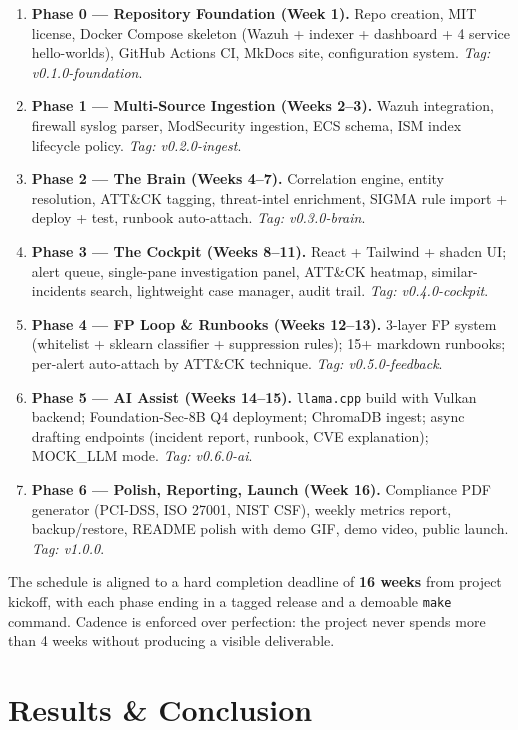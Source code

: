 \documentclass[11pt,a4paper]{article}
\begin{document}
\begin{enumerate}[leftmargin=*, itemsep=2pt]
  \item \textbf{Phase 0 — Repository Foundation (Week 1).} Repo creation, MIT license, Docker Compose skeleton (Wazuh + indexer + dashboard + 4 service hello-worlds), GitHub Actions CI, MkDocs site, configuration system. \textit{Tag: v0.1.0-foundation}.
  \item \textbf{Phase 1 — Multi-Source Ingestion (Weeks 2--3).} Wazuh integration, firewall syslog parser, ModSecurity ingestion, ECS schema, ISM index lifecycle policy. \textit{Tag: v0.2.0-ingest}.
  \item \textbf{Phase 2 — The Brain (Weeks 4--7).} Correlation engine, entity resolution, ATT\&CK tagging, threat-intel enrichment, SIGMA rule import + deploy + test, runbook auto-attach. \textit{Tag: v0.3.0-brain}.
  \item \textbf{Phase 3 — The Cockpit (Weeks 8--11).} React + Tailwind + shadcn UI; alert queue, single-pane investigation panel, ATT\&CK heatmap, similar-incidents search, lightweight case manager, audit trail. \textit{Tag: v0.4.0-cockpit}.
  \item \textbf{Phase 4 — FP Loop \& Runbooks (Weeks 12--13).} 3-layer FP system (whitelist + sklearn classifier + suppression rules); 15+ markdown runbooks; per-alert auto-attach by ATT\&CK technique. \textit{Tag: v0.5.0-feedback}.
  \item \textbf{Phase 5 — AI Assist (Weeks 14--15).} \texttt{llama.cpp} build with Vulkan backend; Foundation-Sec-8B Q4 deployment; ChromaDB ingest; async drafting endpoints (incident report, runbook, CVE explanation); MOCK\_LLM mode. \textit{Tag: v0.6.0-ai}.
  \item \textbf{Phase 6 — Polish, Reporting, Launch (Week 16).} Compliance PDF generator (PCI-DSS, ISO 27001, NIST CSF), weekly metrics report, backup/restore, README polish with demo GIF, demo video, public launch. \textit{Tag: v1.0.0}.
\end{enumerate}

The schedule is aligned to a hard completion deadline of \textbf{16 weeks} from project kickoff, with each phase ending in a tagged release and a demoable \texttt{make} command. Cadence is enforced over perfection: the project never spends more than 4 weeks without producing a visible deliverable.

\newpage
\section{Results \& Conclusion}
\label{sec:results}
\end{document}
